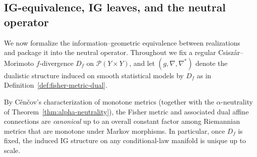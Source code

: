 \documentclass[11pt]{article}
\newcommand{\Pcal}{\mathcal{P}}
\begin{document}
\subsection{IG-equivalence, IG leaves, and the neutral operator}
\label{subsec:ig-equivalence-neutral-operator}

We now formalize the information--geometric equivalence between realizations
and package it into the neutral operator. Throughout we fix a regular
Csisz\'ar--Morimoto $f$-divergence $D_f$ on $\Pcal(Y\times Y)$, and let
$(g,\nabla,\nabla^\ast)$ denote the dualistic structure induced on smooth
statistical models by $D_f$ as in Definition~\ref{def:fisher-metric-dual}.

By C\v{e}n\v{c}ov's characterization of monotone metrics (together with the
$\alpha$-neutrality of Theorem~\ref{thm:alpha-neutrality}), the Fisher
metric and associated dual affine connections are \emph{canonical} up to an
overall constant factor among Riemannian metrics that are monotone under
Markov morphisms. In particular, once $D_f$ is fixed, the induced IG
structure on any conditional-law manifold is unique up to scale.
\end{document}

